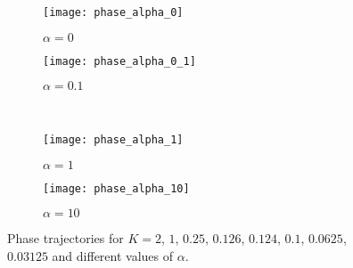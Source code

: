 \documentclass[review]{elsarticle}
\begin{document}
\begin{figure}[htb]
\begin{center}
\begin{subfigure}[htb]{0.40\textwidth}
 \begin{center}
    \texttt{[image: phase\_alpha\_0]}
    \caption{$\alpha=0$}
  \end{center}
   \end{subfigure}\qquad
\begin{subfigure}[htb]{0.40\textwidth}
 \begin{center}
    \texttt{[image: phase\_alpha\_0\_1]}
    \caption{$\alpha=0.1$}
  \end{center}
\end{subfigure}\\[3ex]
\begin{subfigure}[htb]{0.40\textwidth}
  \begin{center}
    \texttt{[image: phase\_alpha\_1]}
    \caption{$\alpha=1$}
  \end{center}
\end{subfigure}\qquad
\begin{subfigure}[htb]{0.40\textwidth}
  \begin{center}
    \texttt{[image: phase\_alpha\_10]}
    \caption{$\alpha=10$}
  \end{center}
\end{subfigure}
	\caption{Phase trajectories for $K=2$, $1$, $0.25$, $0.126$, $0.124$, $0.1$, $0.0625$, $0.03125$ and different values of $\alpha$.}\label{fig_phase_diagrams}
  \end{center}
\end{figure}
\end{document}
